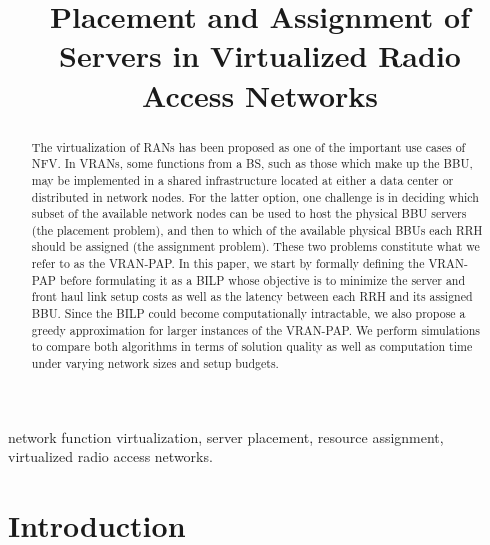 \documentclass[conference]{IEEEtran}
\begin{document}
\title{Placement and Assignment of Servers in Virtualized Radio Access Networks}

\author{
}

\maketitle

\begin{abstract}
The virtualization of \acp{RAN} has been proposed as one of the important use cases of \ac{NFV}. In \acp{VRAN}, some functions from a \ac{BS}, such as those which make up the \ac{BBU}, may be implemented in a shared infrastructure located at either a data center or distributed in network nodes. For the latter option, one challenge is in deciding which subset of the available network nodes can be used to host the physical \ac{BBU} servers (the placement problem), and then to which of the available physical \acp{BBU} each \ac{RRH} should be assigned (the assignment problem). These two problems constitute what we refer to as the \ac{VRAN-PAP}. In this paper, we start by formally defining the \ac{VRAN-PAP} before formulating it as a \ac{BILP} whose objective is to minimize the server and front haul link setup costs as well as the latency between each \ac{RRH} and its assigned \ac{BBU}. Since the \ac{BILP} could become computationally intractable, we also propose a greedy approximation for larger instances of the \ac{VRAN-PAP}. We perform simulations to compare both algorithms in terms of solution quality as well as computation time under varying network sizes and setup budgets.
\end{abstract}

\begin{IEEEkeywords}
network function virtualization, server placement, resource assignment, virtualized radio access networks.
\end{IEEEkeywords}


\section{Introduction}
\end{document}
